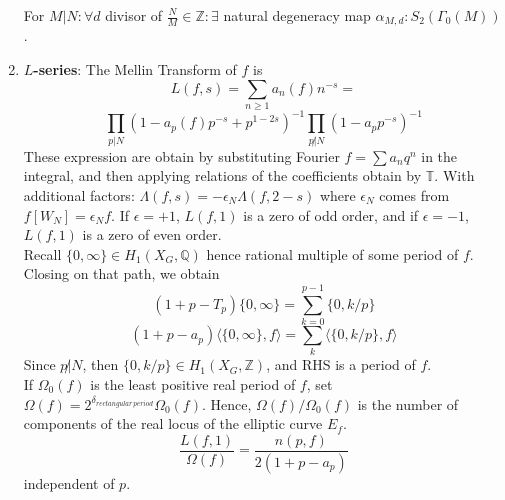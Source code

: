 \documentclass{article}
\newcommand{\Q}{\mathbb{Q}}
\newcommand{\Z}{\mathbb{Z}}
\begin{document}
\begin{multicols}{2}
\begin{enumerate}
For $M|N: \forall d$ divisor of $\frac{N}{M} \in \Z: \exists$ natural degeneracy map $\alpha_{M,d}: S_2(\Gamma_0(M))$. 


\item \textbf{$L$-series}: The Mellin Transform of $f$ is 
\[L(f,s) = \sum_{n \geq 1} a_n(f)n^{-s} =\]
\[ \prod_{p|N} (1-a_p(f)p^{-s} + p^{1-2s})^{-1}\prod_{p\not|N}(1-a_pp^{-s})^{-1}\]
These expression are obtain by substituting Fourier $f = \sum a_nq^n$ in the integral, and then applying relations of the coefficients obtain by $\mathbb{T}$. With additional factors: $\Lambda(f,s) = -\epsilon_N \Lambda(f,2-s)$ where $\epsilon_N$ comes from $f[W_N] = \epsilon_N f$. If $\epsilon = +1$, $L(f,1)$ is a zero of odd order, and if $\epsilon = -1$, $L(f,1)$ is a zero of even order. \\

Recall $\{0,\infty\} \in H_1(X_G,\Q)$ hence rational multiple of some period of $f$. Closing on that path, we obtain 
\[(1+p-T_p)\{0,\infty\} = \sum_{k=0}^{p-1}\{0,k/p\}\]
\[(1+p-a_p)\langle \{0,\infty\},f\rangle = \sum_k \langle \{0,k/p\}, f\rangle\]
Since $p\not|N$, then $\{0,k/p\} \in H_1(X_G,\Z)$, and RHS is a period of $f$. \\
If $\Omega_0(f)$ is the least positive real period of $f$, set $\Omega(f) = 2^{\delta_{rectangular\,period}}\Omega_0(f)$. Hence, $\Omega(f)/\Omega_0(f)$ is the number of components of the real locus of the elliptic curve $E_f$. 
\[\frac{L(f,1)}{\Omega(f)} = \frac{n(p,f)}{2(1+p-a_p)}\]
independent of $p$.
\end{enumerate}
\end{multicols}
\end{document}
